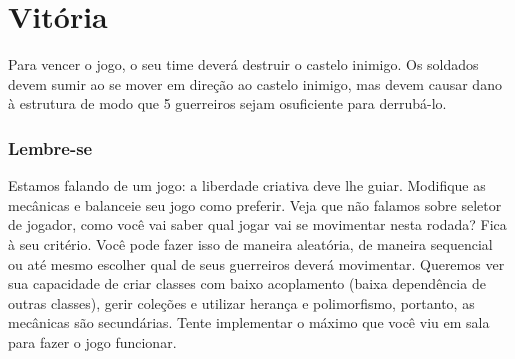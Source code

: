 \documentclass{article}
\begin{document}
\section*{Vitória}
Para vencer o jogo, o seu time deverá destruir o castelo inimigo. Os soldados devem sumir ao se mover em direção ao castelo inimigo, mas devem causar dano à estrutura de modo que 5 guerreiros sejam o​ suficiente​​ para derrubá-lo.
\subsubsection*{Lembre-se}
\par Estamos falando de um jogo: a liberdade criativa deve lhe guiar. Modifique as mecânicas e balanceie seu jogo como preferir. Veja que não falamos sobre seletor de jogador, como você vai saber qual jogar vai se movimentar nesta rodada? Fica à seu critério. Você pode fazer isso de maneira aleatória, de maneira sequencial ou até mesmo escolher qual de seus
guerreiros deverá movimentar. Queremos ver sua capacidade de criar classes com baixo acoplamento (baixa dependência de outras classes), gerir coleções e utilizar herança e polimorfismo, portanto, as mecânicas são secundárias. Tente implementar o máximo que você viu em sala para fazer o jogo funcionar.
\end{document}
